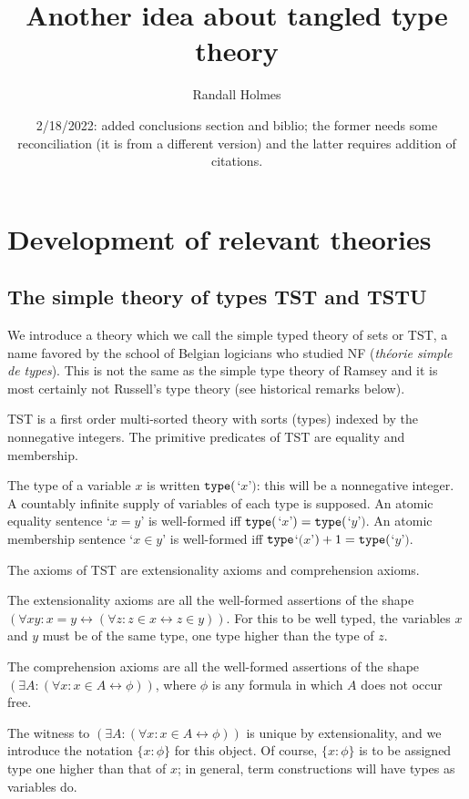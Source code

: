 \documentclass[12pt]{article}
\title{Another idea about tangled type theory}
\author{Randall Holmes}
\date{2/18/2022: added conclusions section and biblio;  the former needs some reconciliation (it is from a different version) and the latter requires addition of citations.}
\begin{document}
\maketitle

\tableofcontents

\newpage

\section{Development of relevant theories}

\subsection{The simple theory of types TST and TSTU}

We introduce a theory which we call the simple typed theory of sets or TST, a name favored by the school of Belgian logicians who studied NF ({\em th\'eorie simple de types}).  This is not the same as the simple type theory of Ramsey and it is most certainly not Russell's type theory  (see historical remarks below).

TST is a first order multi-sorted theory with sorts (types) indexed by the nonnegative integers.  The primitive predicates of TST are equality and membership.

The type of a variable $x$ is written ${\tt type}($`$x$'$)$:  this will be a nonnegative integer.   A countably infinite supply of variables of each type is supposed.  An atomic equality sentence `$x=y$' is well-formed iff ${\tt type}($`$x$'$)={\tt type}($`$y$'$)$.
An atomic membership sentence `$x \in y$' is well-formed iff ${\tt type}$`$(x$'$)+1 = {\tt type}($`$y$'$)$.

The axioms of TST are extensionality axioms and comprehension axioms.

The extensionality axioms are all the well-formed assertions of the shape $(\forall xy:x=y \leftrightarrow (\forall z:z \in x \leftrightarrow z\in y))$.  For this to be well typed, the variables
$x$ and $y$ must be of the same type, one type higher than the type of $z$.

The comprehension axioms are all the well-formed assertions of the shape $(\exists A:(\forall x:x \in A \leftrightarrow \phi))$, where $\phi$ is any formula in which $A$ does not occur free.

The witness to $(\exists A:(\forall x:x \in A \leftrightarrow \phi))$ is unique by extensionality, and we introduce the notation $\{x:\phi\}$ for this object.  Of course, $\{x:\phi\}$  is to be assigned type one higher than that of $x$;  in general, term constructions will have types as variables do.
\end{document}
